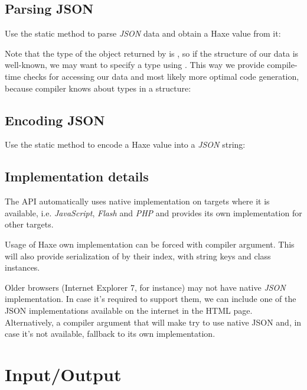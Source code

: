 \subsection{Parsing JSON}
\label{std-Json-parsing}

Use the  static method to parse \emph{JSON} data and obtain a Haxe value from it:

Note that the type of the object returned by  is , so if the structure of our data is well-known, we may want to specify a type using . This way we provide compile-time checks for accessing our data and most likely more optimal code generation, because compiler knows about types in a structure:

\subsection{Encoding JSON}
\label{std-Json-encoding}

Use the  static method to encode a Haxe value into a \emph{JSON} string:

\subsection{Implementation details}
\label{std-Json-implementation-details}

The  API automatically uses native implementation on targets where it is available, i.e. \emph{JavaScript}, \emph{Flash} and \emph{PHP} and provides its own implementation for other targets.

Usage of Haxe own implementation can be forced with  compiler argument. This will also provide serialization of  by their index,  with string keys and class instances.

Older browsers (Internet Explorer 7, for instance) may not have native \emph{JSON} implementation. In case it's required to support them, we can include one of the JSON implementations available on the internet in the HTML page. Alternatively, a  compiler argument that will make  try to use native JSON and, in case it's not available, fallback to its own implementation.

\section{Input/Output}
\label{std-input-output}

